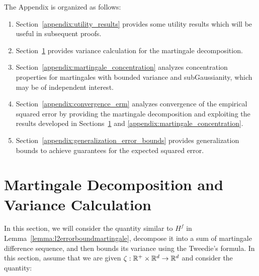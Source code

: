 


\appendix


The Appendix is organized as follows:
\begin{enumerate}
    \item Section~\ref{appendix:utility_results} provides some utility results which will be useful in subsequent proofs.
    \item Section~\ref{appendix:variance_calculation} provides variance calculation for the martingale decomposition.
    \item Section~\ref{appendix:martingale_concentration} analyzes concentration properties for  martingales with bounded variance and subGaussianity, which may be of independent interest.
    \item Section~\ref{appendix:convergence_erm} analyzes convergence of the empirical squared error by providing the martingale decomposition and exploiting the results developed in Sections~\ref{appendix:variance_calculation} and \ref{appendix:martingale_concentration}.
    \item Section~\ref{appendix:generalization_error_bounds} provides generalization bounds to achieve guarantees for the expected squared error.
\end{enumerate}






\section{Martingale Decomposition and Variance Calculation}
\label{appendix:variance_calculation}
In this section, we will consider the quantity similar to $H^f$ in Lemma~\ref{lemma:l2errorboundmartingale}, decompose it into a sum of martingale difference sequence, and then bounds its variance using the Tweedie's formula. In this section, assume that we are given $\zeta : \mathbb{R}^+ \times \mathbb{R}^d \to \mathbb{R}^d$ and consider the quantity:

